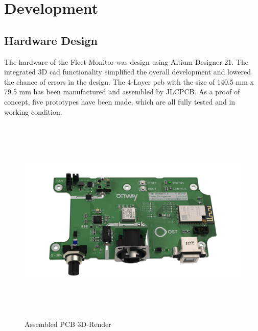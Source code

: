 \chapter{Development}

\section{Hardware Design}
The hardware of the Fleet-Monitor was design using Altium Designer 21. The integrated 3D \acrshort{cad} functionality simplified the overall development and lowered the chance of errors in the design. The 4-Layer \acrfull{pcb} with the size of 140.5 mm x 79.5 mm has been manufactured and assembled by JLCPCB.\newline
As a proof of concept, five prototypes have been made, which are all fully tested and in working condition.

\begin{figure}[h!]
	\hfuzz=57.0pt
	\hspace{-1.4cm}
	\includegraphics[height=10.0cm]{images/fleet-monitor-rendering-pcb}
	\caption{Assembled PCB 3D-Render}
	\label{fig:fleet-monitor-rendering-pcb}
\end{figure}
\newpage

